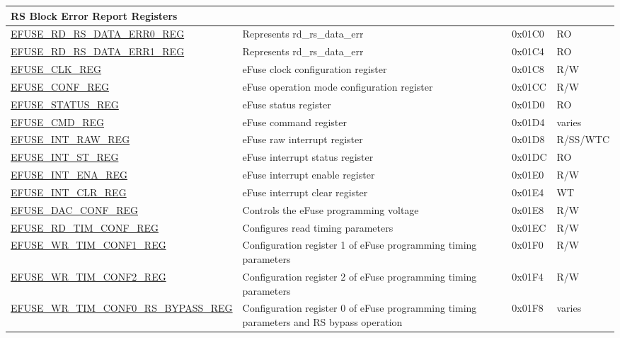 \begin{longtable}{ | p{7cm} | p{6cm} | p{1.2cm} | p{1.5cm} | }
\multicolumn{4}{|l|}{\textbf{RS Block Error Report Registers}} \\ \hline
\hyperref[regdesc:EFUSERDRSDATAERR0REG]{EFUSE\_RD\_RS\_DATA\_ERR0\_REG} & Represents rd\_rs\_data\_err & 0x01C0 & RO \\ \hline
\hyperref[regdesc:EFUSERDRSDATAERR1REG]{EFUSE\_RD\_RS\_DATA\_ERR1\_REG} & Represents rd\_rs\_data\_err & 0x01C4 & RO \\ \hline
\hyperref[regdesc:EFUSECLKREG]{EFUSE\_CLK\_REG} & eFuse clock configuration register & 0x01C8 & R/W \\ \hline
\hyperref[regdesc:EFUSECONFREG]{EFUSE\_CONF\_REG} & eFuse operation mode configuration register & 0x01CC & R/W \\ \hline
\hyperref[regdesc:EFUSESTATUSREG]{EFUSE\_STATUS\_REG} & eFuse status register & 0x01D0 & RO \\ \hline
\hyperref[regdesc:EFUSECMDREG]{EFUSE\_CMD\_REG} & eFuse command register & 0x01D4 & varies \\ \hline
\hyperref[regdesc:EFUSEINTRAWREG]{EFUSE\_INT\_RAW\_REG} & eFuse raw interrupt register & 0x01D8 & R/SS/WTC \\ \hline
\hyperref[regdesc:EFUSEINTSTREG]{EFUSE\_INT\_ST\_REG} & eFuse interrupt status register & 0x01DC & RO \\ \hline
\hyperref[regdesc:EFUSEINTENAREG]{EFUSE\_INT\_ENA\_REG} & eFuse interrupt enable register & 0x01E0 & R/W \\ \hline
\hyperref[regdesc:EFUSEINTCLRREG]{EFUSE\_INT\_CLR\_REG} & eFuse interrupt clear register & 0x01E4 & WT \\ \hline
\hyperref[regdesc:EFUSEDACCONFREG]{EFUSE\_DAC\_CONF\_REG} & Controls the eFuse programming voltage & 0x01E8 & R/W \\ \hline
\hyperref[regdesc:EFUSERDTIMCONFREG]{EFUSE\_RD\_TIM\_CONF\_REG} & Configures read timing parameters & 0x01EC & R/W \\ \hline
\hyperref[regdesc:EFUSEWRTIMCONF1REG]{EFUSE\_WR\_TIM\_CONF1\_REG} & Configuration register 1 of eFuse programming timing parameters & 0x01F0 & R/W \\ \hline
\hyperref[regdesc:EFUSEWRTIMCONF2REG]{EFUSE\_WR\_TIM\_CONF2\_REG} & Configuration register 2 of eFuse programming timing parameters & 0x01F4 & R/W \\ \hline
\hyperref[regdesc:EFUSEWRTIMCONF0RSBYPASSREG]{EFUSE\_WR\_TIM\_CONF0\_RS\_BYPASS\_REG} & Configuration register 0 of eFuse programming timing parameters and RS bypass operation & 0x01F8 & varies \\ \hline

\end{longtable}
